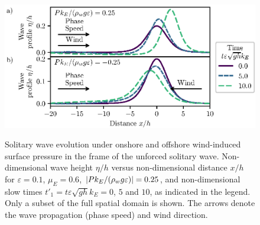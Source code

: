 \documentclass{jfm}
\renewcommand*{\epsilon}{\varepsilon}
\begin{document}
\begin{figure}
  \centering
  { %
    \label{fig:snapshots_solitary:a}
    \label{fig:snapshots_solitary:b}
  }
  \includegraphics{Snapshots-Positive-Negative-Production.eps}
  \caption{
    Solitary wave evolution under
    onshore and
    offshore wind-induced surface pressure in the frame of the unforced
    solitary wave.
    Non-dimensional wave height $\eta/h$ versus
    non-dimensional distance $x/h$ for $\epsilon=0.1$,
    $\mu_E = 0.6$, $\abs{P k_E/(\rho_w g \epsilon)} = 0.25$, and
    non-dimensional slow times $t'_1 = t \epsilon \sqrt{gh} k_E = 0$,
    $5$ and $10$, as indicated in the legend.
    Only a subset of the full spatial domain is shown.
    The arrows denote the wave propagation (phase speed) and wind
    direction.
  }\label{fig:snapshots_solitary}
\end{figure}
\end{document}

